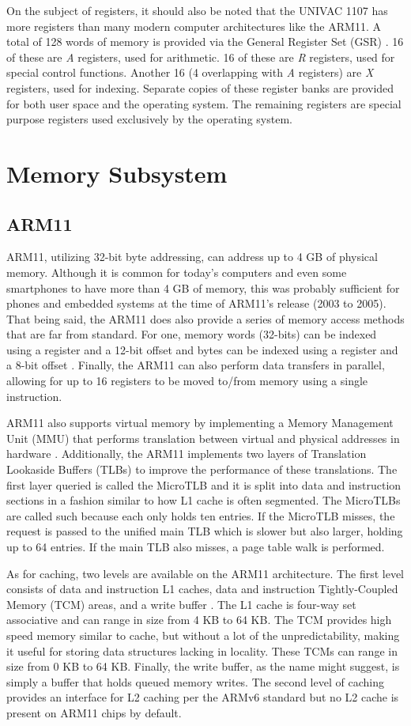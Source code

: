 \documentclass[onecolumn, draftclsnofoot, 10pt, compsoc]{IEEEtran}
\begin{document}
On the subject of registers, it should also be noted that the UNIVAC 1107 has more registers than many modern computer architectures like the ARM11. A total of 128 words of memory is provided via the General Register Set (GSR) \cite{univacarch}. 16 of these are \textit{A} registers, used for arithmetic. 16 of these are \textit{R} registers, used for special control functions. Another 16 (4 overlapping with \textit{A} registers) are \textit{X} registers, used for indexing. Separate copies of these register banks are provided for both user space and the operating system. The remaining registers are special purpose registers used exclusively by the operating system.
\section{Memory Subsystem}
\subsection{ARM11}
ARM11, utilizing 32-bit byte addressing, can address up to 4 GB of physical memory. Although it is common for today's computers and even some smartphones to have more than 4 GB of memory, this was probably sufficient for phones and embedded systems at the time of ARM11's release (2003 to 2005). That being said, the ARM11 does also provide a series of memory access methods that are far from standard. For one, memory words (32-bits) can be indexed using a register and a 12-bit offset and bytes can be indexed using a register and a 8-bit offset \cite{armslides}. Finally, the ARM11 can also perform data transfers in parallel, allowing for up to 16 registers to be moved to/from memory using a single instruction.

ARM11 also supports virtual memory by implementing a Memory Management Unit (MMU) that performs translation between virtual and physical addresses in hardware \cite{arm11manual}. Additionally, the ARM11 implements two layers of Translation Lookaside Buffers (TLBs) to improve the performance of these translations. The first layer queried is called the MicroTLB and it is split into data and instruction sections in a fashion similar to how L1 cache is often segmented. The MicroTLBs are called such because each only holds ten entries. If the MicroTLB misses, the request is passed to the unified main TLB which is slower but also larger, holding up to 64 entries. If the main TLB also misses, a page table walk is performed.

As for caching, two levels are available on the ARM11 architecture. The first level consists of data and instruction L1 caches, data and instruction Tightly-Coupled Memory (TCM) areas, and a write buffer \cite{arm11manual}. The L1 cache is four-way set associative and can range in size from 4 KB to 64 KB. The TCM provides high speed memory similar to cache, but without a lot of the unpredictability, making it useful for storing data structures lacking in locality. These TCMs can range in size from 0 KB to 64 KB. Finally, the write buffer, as the name might suggest, is simply a buffer that holds queued memory writes. The second level of caching provides an interface for L2 caching per the ARMv6 standard but no L2 cache is present on ARM11 chips by default.
\end{document}

